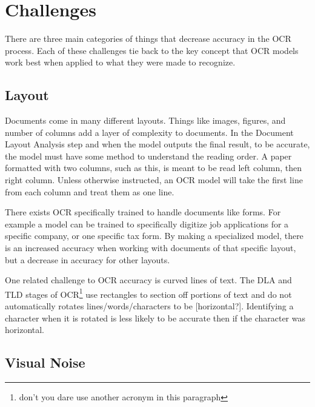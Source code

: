 \documentclass[sigplan,screen,nonacm]{acmart-tagged}
\begin{document}
\section{Challenges}
\label{sec:body}
There are three main categories of things that decrease accuracy in the OCR process. Each of these challenges tie back to the key concept that OCR models work best when applied to what they were made to recognize.

\subsection{Layout}
\label{Layout}
Documents come in many different layouts. Things like images, figures, and number of columns add a layer of complexity to documents. In the Document Layout Analysis step and when the model outputs the final result, to be accurate, the model must have some method to understand the reading order. 
A paper formatted with two columns, such as this, is meant to be read left column, then right column. Unless otherwise instructed, an OCR model will take the first line from each column and treat them as one line. 

There exists OCR specifically trained to handle documents like forms. For example a model can be trained to specifically digitize job applications for a specific company, or one specific tax form. By making a specialized  model, there is an increased accuracy when working with documents of that specific layout, but a decrease in accuracy for other layouts. 

One related challenge to OCR accuracy is curved lines of text. The DLA and TLD stages of OCR\footnote{don't you dare use another acronym in this paragraph} use rectangles to section off portions of text and do not automatically rotates lines/words/characters to be [horizontal?]. Identifying a character when it is rotated is less likely to be accurate then if the character was horizontal. \citep{Fateh:2024}

\subsection{Visual Noise}
\label{Noise}
\end{document}
